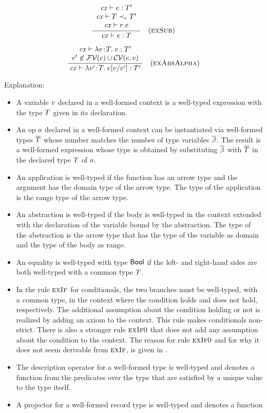 \[
\frac{\begin{array}{c}\mathit{cx}\vdash e:T'\\\mathit{cx}\vdash T\prec_{r}T'\\\mathit{cx}\vdash r\;e\end{array}}{\mathit{cx}\vdash e:T}\quad\mbox{(\textsc{exSub})}
\]

\[
\frac{\begin{array}{c}\mathit{cx}\vdash\lambda v\!:\!T.\;e:T'\\v'\not\in\mathcal{FV}(e)\cup\mathcal{CV}(e,v)\end{array}}{\mathit{cx}\vdash\lambda v'\!:\!T.\;e[v/v']:T'}\quad\mbox{(\textsc{exAbsAlpha})}
\]

Explanation:
\begin{itemize}
\item
A variable $v$ declared in a well-formed context is a well-typed expression
with the type $T$ given in its declaration.
\item
An op $o$ declared in a well-formed context can be instantiated via
well-formed types $\overline{T}$ whose number matches the number of type variables
$\overline{\beta}$. The result is a well-formed expression whose type is obtained by
substituting $\overline{\beta}$ with $\overline{T}$ in the declared type $T$ of $o$.
\item
An application is well-typed if the function has an arrow type and the
argument has the domain type of the arrow type. The type of the application is
the range type of the arrow type.
\item
An abstraction is well-typed if the body is well-typed in the context extended
with the declaration of the variable bound by the abstraction. The type of the
abstraction is the arrow type that has the type of the variable as domain and
the type of the body as range.
\item
An equality is well-typed with type $\mathsf{Bool}$ if the left- and right-hand sides
are both well-typed with a common type $T$.
\item
In the rule $\textsc{exIf}$ for conditionals, the two branches must be well-typed,
with a common type, in the context where the condition holds and does not
hold, respectively. The additional assumption about the condition holding or
not is realized by adding an axiom to the context. This rule makes
conditionals non-strict. There is also a stronger rule $\textsc{exIf0}$ that does not
add any assumption about the condition to the context. The reason for rule
$\textsc{exIf0}$ and for why it does not seem derivable from $\textsc{exIf}$, is given in
.
\item
The description operator for a well-formed type is well-typed and denotes a
function from the predicates over the type that are satisfied by a unique
value to the type itself.
\item
A projector for a well-formed record type is well-typed and denotes a function

\end{itemize}
